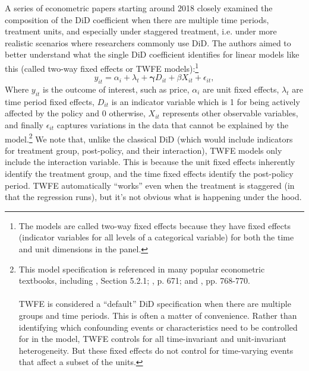 \documentclass[12pt]{article}
\begin{document}
A series of econometric papers starting around 2018 closely examined the composition of the DiD coefficient when there are multiple time periods, treatment units, and especially under staggered treatment, i.e. under more realistic scenarios where researchers commonly use DiD. The authors aimed to better understand what the single DiD coefficient identifies for linear models like this (called two-way fixed effects or TWFE models):\footnote{The models are called two-way fixed effects because they have fixed effects (indicator variables for all levels of a categorical variable) for both the time and unit dimensions in the panel.}
\begin{equation}
    y_{it} = \alpha_i + \lambda_t + \boldsymbol{\gamma}  D_{it} + \beta X_{it} + \epsilon_{it},
\end{equation}
Where $y_{it}$ is the outcome of interest, such as price, $\alpha_i$ are unit fixed effects, $\lambda_t$ are time period fixed effects, $D_{it}$ is an indicator variable which is 1 for being actively affected by the policy and 0 otherwise, $X_{it}$ represents other observable variables, and finally $\epsilon_{it}$ captures variations in the data that cannot be explained by the model.\footnote{This model specification is referenced in many popular econometric textbooks, including  \citet{angrist2009mostly}, Section 5.2.1; \citet{hansen2022econometrics}, p. 671; and \citet{cameron2020}, pp. 768-770. \\\\ TWFE is considered a “default” DiD specification when there are multiple groups and time periods. This is often a matter of convenience. Rather than identifying which confounding events or characteristics need to be controlled for in the model, TWFE controls for all time-invariant and unit-invariant heterogeneity. But these fixed effects do not control for time-varying events that affect a subset of the units.}  We note that, unlike the classical DiD (which would include indicators for treatment group, post-policy, and their interaction), TWFE models only include the interaction variable. This is because the unit fixed effects inherently identify the treatment group, and the time fixed effects identify the post-policy period. TWFE automatically “works” even when the treatment is staggered (in that the regression runs), but it’s not obvious what is happening under the hood.
\end{document}
